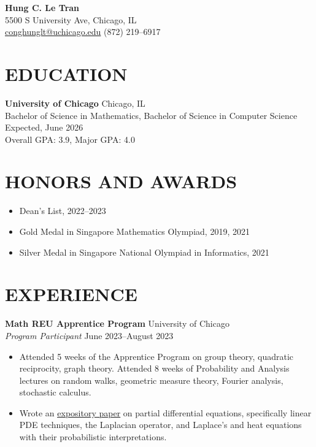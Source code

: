 \documentclass[a4paper, 11pt]{extarticle}
\begin{document}
\pagestyle{empty}

\begin{center}
\textbf{\Large Hung C. Le Tran}\\
5500 S University Ave, Chicago, IL \\
\href{mailto:conghunglt@uchicago.edu}{conghunglt@uchicago.edu} \quad  (872) 219--6917
\end{center}

\section*{EDUCATION}
\noindent
\textbf{University of Chicago} \hfill Chicago, IL\\
Bachelor of Science in Mathematics, Bachelor of Science in Computer Science \hfill Expected, June 2026\\
Overall GPA: 3.9, Major GPA: 4.0

\section*{HONORS AND AWARDS}
\begin{itemize}
    \item Dean's List, 2022--2023
    \item Gold Medal in Singapore Mathematics Olympiad, 2019, 2021
    \item Silver Medal in Singapore National Olympiad in Informatics, 2021
\end{itemize}

\section*{EXPERIENCE}
\textbf{Math REU Apprentice Program} \hfill University of Chicago \\
\textit{Program Participant} \hfill June 2023--August 2023
\begin{itemize}
    \item Attended 5 weeks of the Apprentice Program on group theory, quadratic reciprocity, graph theory. Attended 8 weeks of Probability and Analysis lectures on random walks, geometric measure theory, Fourier analysis, stochastic calculus.
    \item Wrote an \href{https://math.uchicago.edu/~may/REU2023/REUPapers/LeTran.pdf}{\underline{expository paper}} on partial differential equations, specifically linear PDE techniques, the Laplacian operator, and Laplace's and heat equations with their probabilistic interpretations.
\end{itemize}
\end{document}
